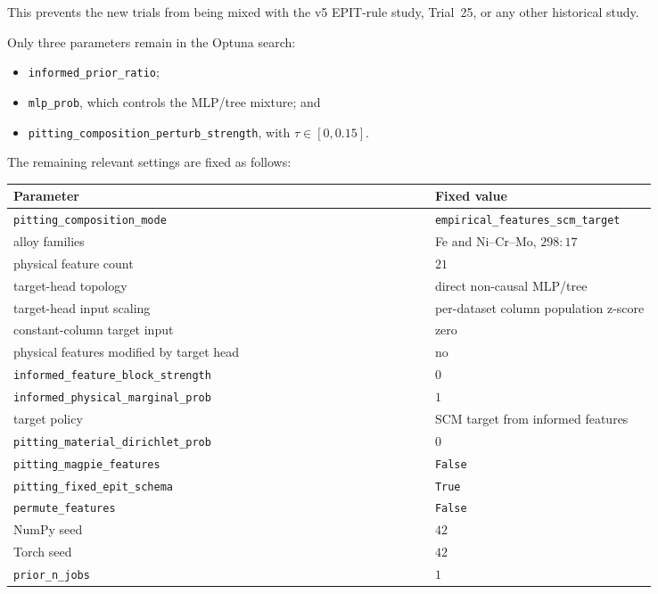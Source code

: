 \documentclass{article}
\begin{document}
This prevents the new trials from being mixed with the v5 EPIT-rule study,
Trial~25, or any other historical study.

Only three parameters remain in the Optuna search:

\begin{itemize}
    \item \texttt{informed\_prior\_ratio};
    \item \texttt{mlp\_prob}, which controls the MLP/tree mixture; and
    \item \texttt{pitting\_composition\_perturb\_strength},
    with \(\tau\in[0,0.15]\).
\end{itemize}

The remaining relevant settings are fixed as follows:

\begin{center}
\small
\begin{tabular}{p{0.58\linewidth}p{0.26\linewidth}}
\hline
\textbf{Parameter} & \textbf{Fixed value} \\
\hline
\texttt{pitting\_composition\_mode}
& \texttt{empirical\_features\_scm\_target} \\
alloy families
& Fe and Ni--Cr--Mo, \(298:17\) \\
physical feature count
& \(21\) \\
target-head topology
& direct non-causal MLP/tree \\
target-head input scaling
& per-dataset column population z-score \\
constant-column target input
& zero \\
physical features modified by target head
& no \\
\texttt{informed\_feature\_block\_strength}
& \(0\) \\
\texttt{informed\_physical\_marginal\_prob}
& \(1\) \\
target policy
& SCM target from informed features \\
\texttt{pitting\_material\_dirichlet\_prob}
& \(0\) \\
\texttt{pitting\_magpie\_features}
& \texttt{False} \\
\texttt{pitting\_fixed\_epit\_schema}
& \texttt{True} \\
\texttt{permute\_features}
& \texttt{False} \\
NumPy seed
& \(42\) \\
Torch seed
& \(42\) \\
\texttt{prior\_n\_jobs}
& \(1\) \\
\hline
\end{tabular}
\end{center}
\end{document}
